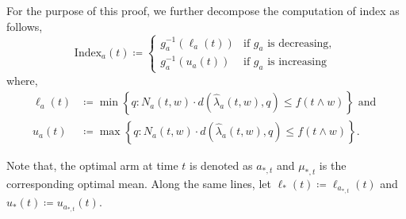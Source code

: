 \documentclass[letterpaper]{article} %
\newcommand{\defined}{\coloneqq}
\newcommand{\optArm}[1]{a_{*, #1}}
\newcommand{\optMean}[1]{\mu_{*, #1}}
\newcommand{\windowsize}{w}
\begin{document}
\noindent
For the purpose of this proof, we further decompose the computation of index as follows,
$$\mathrm{Index}_a(t) \defined
    \begin{cases}
      g_a^{-1}({\ell_a(t)}) & \text{if } g_a \text{ is decreasing}, \\
      g_a^{-1}({u_a(t)}) & \text{if } g_a \text{ is increasing}
    \end{cases}
$$
where,
\begin{align*}
\ell_a(t)  &\defined  \min \left\{q: N_a(t, \windowsize)\cdot{}d\left(\hat{\lambda}_a(t, \windowsize), q\right) \leq f\left(  t \wedge \windowsize \right)\right\} \text{ and } \\
u_a(t)  &\defined  \max \left\{q: N_a(t, \windowsize)\cdot{}d\left(\hat{\lambda}_a(t, \windowsize), q\right) \leq f\left( t \wedge \windowsize \right) \right\}.
\end{align*}

Note that, the optimal arm at time $t$ is denoted as $\optArm{t}$ and $\optMean{t}$ is the corresponding optimal mean. Along the same lines, let $\ell_*(t) \defined \ell_{\optArm{t}}(t)$ and $u_*(t) \defined u_{\optArm{t}}(t)$. 
\end{document}
